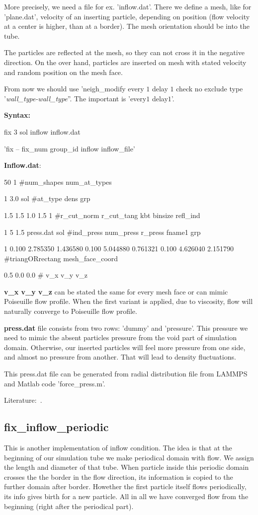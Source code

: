 \documentclass[a4paper,10pt]{scrreprt}
\begin{document}
More precisely, we need a file for ex. 'inflow.dat'. There we define a mesh, like for 'plane.dat', velocity of an inserting particle, depending on position (flow velocity at a center is higher, than at a border). The mesh orientation should be into the tube.

The particles are reflected at the mesh, so they can not cross it in the negative direction. On the over hand, particles are inserted on mesh with stated velocity and random position on the mesh face.

From now we should use 'neigh\_modify    every $1$ delay $1$ check no exclude type '\textit{wall\_type-wall\_type}''. The important is 'every$1$ delay$1$'.

\textbf{Syntax:}

fix     $3$ sol inflow inflow.dat

'fix -- fix\_num group\_id inflow inflow\_file'

\textbf{Inflow.dat}:

50 1 \#num\_shapes num\_at\_types

1 3.0 sol \#at\_type dens grp

1.5 1.5 1.0 1.5 1 \#r\_cut\_norm r\_cut\_tang kbt binsize refl\_ind

1 5 1.5 press.dat sol \#ind\_press num\_press r\_press fname1 grp

1 0.100 2.785350 1.436580 0.100 5.044880 0.761321 0.100 4.626040 2.151790 \#triangORrectang mesh\_face\_coord

0.5 0.0 0.0 \# v\_x v\_y v\_z

\textbf{v\_x v\_y v\_z} can be stated the same for every mesh face or can mimic Poiseuille flow profile. When the first variant is applied, due to viscosity, flow will naturally converge to Poiseuille flow profile.

\textbf{press.dat} file consists from two rows: 'dummy' and 'pressure'. This pressure we need to mimic the absent particles pressure from the void part of simulation domain. Otherwise, our inserted particles will feel more pressure from one side, and almost no pressure from another. That will lead to density fluctuations.

This press.dat file can be generated from radial distribution file from LAMMPS and Matlab code 'force\_press.m'.

Literature:~\cite{Lei20113765}.

\subsection{fix\_inflow\_periodic}
This is another implementation of inflow condition. The idea is that at the beginning of our simulation tube we make periodical domain with flow. We assign the length and diameter of that tube. When particle inside this periodic domain crosses the the border in the flow direction, its information is copied to the further domain after border. Howether the first particle itself flows periodically, its info gives birth for a new particle. All in all we have converged flow from the beginning (right after the periodical part).
\end{document}
